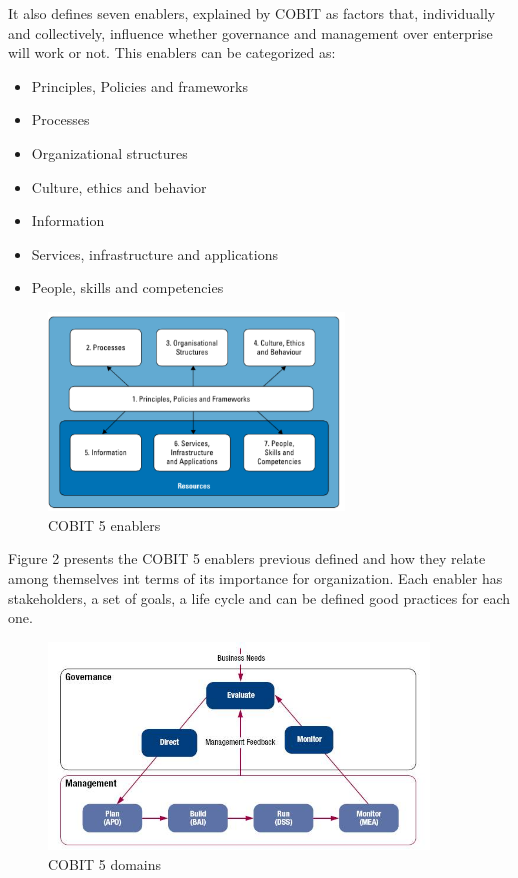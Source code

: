 It also defines seven enablers, explained by COBIT as factors that, individually and collectively, influence whether governance and management over enterprise will work or not. This enablers can be categorized as:

\begin{itemize}
  \item Principles, Policies and frameworks 
  \item Processes 
  \item Organizational structures
  \item Culture, ethics and behavior 
  \item Information
  \item Services, infrastructure and applications
  \item People, skills and competencies
\end{itemize}

\begin{figure}
\centering
\includegraphics[width=0.7\textwidth]{img/Enablers.png}
\caption{COBIT 5 enablers}
\end{figure}

Figure 2 presents the COBIT 5 enablers previous defined and how they relate among themselves int terms of its importance for organization. Each enabler has stakeholders, a set of goals, a life cycle and can be defined good practices for each one.\par

\begin{figure}
\centering
\includegraphics[width=0.9\textwidth]{img/COBITProcesses.jpg}
\caption{COBIT 5 domains}
\end{figure}

